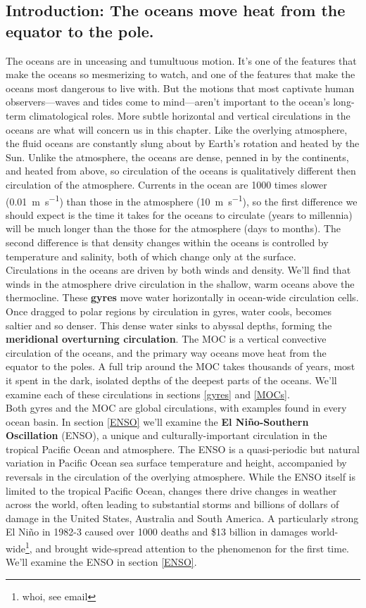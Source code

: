 \documentclass[amstex,12pt]{book}
\begin{document}
{\subsection{Introduction: The oceans move heat from the equator to the pole.}
The oceans are in unceasing and tumultuous motion. It's one of the features that make the oceans so mesmerizing to watch, and one of the features that make the oceans most dangerous to live with. But the motions that most captivate human observers---waves and tides come to mind---aren't important to the ocean's long-term climatological roles. More subtle horizontal and vertical circulations in the oceans are what will concern us in this chapter. Like the overlying atmosphere, the fluid oceans are constantly slung about by Earth's rotation and heated by the Sun. Unlike the atmosphere, the oceans are dense, penned in by the continents, and heated from above, so circulation of the oceans is qualitatively different then circulation of the atmosphere. Currents in the ocean are 1000 times slower (\SI{0.01}{\metre\per\second}) than those in the atmosphere (\SI{10}{\metre\per\second}), so the first difference we should expect is the time it takes for the oceans to circulate (years to millennia) will be much longer than the those for the atmosphere (days to months). The second difference is that density changes within the oceans is controlled by temperature and salinity, both of which change only at the surface.\\
Circulations in the oceans are driven by both winds and density. We'll find that winds in the atmosphere drive circulation in the shallow, warm oceans above the thermocline. These \textbf{gyres} move water horizontally in ocean-wide circulation cells. Once dragged to polar regions by circulation in gyres, water cools, becomes saltier and so denser. This dense water sinks to abyssal depths, forming the \textbf{meridional overturning circulation}. The MOC is a vertical convective circulation of the oceans, and the primary way oceans move heat from the equator to the poles. A full trip around the MOC takes thousands of years, most it spent in the dark, isolated depths of the deepest parts of the oceans. We'll examine each of these circulations in sections \ref{gyres} and \ref{MOCs}.\\
Both gyres and the MOC are global circulations, with examples found in every ocean basin. In section \ref{ENSO} we'll examine the \textbf{El Ni\~no-Southern Oscillation} (ENSO), a unique and culturally-important circulation in the tropical Pacific Ocean and atmosphere. The ENSO is a quasi-periodic but natural variation in Pacific Ocean sea surface temperature and height, accompanied by reversals in the circulation of the overlying atmosphere. While the ENSO itself is limited to the tropical Pacific Ocean, changes there drive changes in weather across the world, often leading to substantial storms and billions of dollars of damage in the United States, Australia and South America. A particularly strong El Ni\~no in 1982-3 caused over 1000 deaths and \$13 billion in damages world-wide\footnote{whoi, see email}, and brought wide-spread attention to the phenomenon for the first time. We'll examine the ENSO in section \ref{ENSO}.      
}
\end{document}
